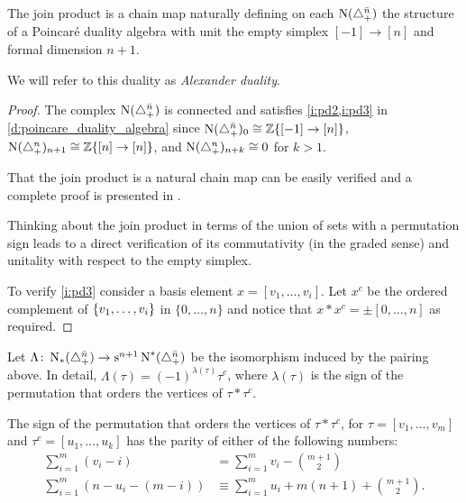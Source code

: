 \begin{theorem}
	The join product is a chain map naturally defining on each $\operatorname{N}(\triangle_{+}^{{\bar{n}}})$ the structure of a Poincar\'e duality algebra with unit the empty simplex $[-1] \to [n]$ and formal dimension $n+1$.
\end{theorem}
We will refer to this duality as \emph{Alexander duality}.

\begin{proof}
	The complex $\operatorname{N}(\triangle_{+}^{{\bar{n}}})$ is connected and satisfies \cref{i:pd2,i:pd3} in \cref{d:poincare_duality_algebra} since $\operatorname{N}(\triangle_{+}^{{\bar{n}}})_0 \cong \mathbb{Z}\{[-1] \to [n]\}$, $\operatorname{N}(\triangle_{+}^{n})_{n+1} \cong \mathbb{Z}\{[n] \to [n]\}$, and $\operatorname{N}(\triangle_{+}^{n})_{n+k} \cong 0$ for $k>1$.

	That the join product is a natural chain map can be easily verified and a complete proof is presented in \cite[p.19]{medina2020prop1}.

	Thinking about the join product in terms of the union of sets with a permutation sign leads to a direct verification of its commutativity (in the graded sense) and unitality with respect to the empty simplex.

	To verify \cref{i:pd3} consider a basis element $x = [v_1,\dots,v_i]$.
	Let $x^c$ be the ordered complement of $\{v_1,\dots,v_i\}$ in $\{0,\dots,n\}$ and notice that $x \ast x^c = \pm [0,\dots,n]$ as required.
\end{proof}
\begin{definition}
    Let $\Lambda\colon \operatorname{N}_*(\triangle_{+}^{\bar{n}})\to \operatorname{s}^{n+1}\operatorname{N}^*(\triangle_{+}^{\bar{n}})$ be the isomorphism induced by the pairing above. In detail, $\Lambda(\tau) = (-1)^{\lambda(\tau)}\tau^c$, where $\lambda(\tau)$ is the sign of the permutation that orders the vertices of $\tau*\tau^c$.
\end{definition}
\begin{remark}
    The sign of the permutation that orders the vertices of $\tau*\tau^c$, for $\tau = [v_1,\ldots,v_m]$ and $\tau^c  = [u_1,\ldots,u_k]$ has the parity of either of the following numbers: 
    \begin{align*}
        \sum_{i=1}^m (v_i-i) &= \sum_{i=1}^m v_i - \binom{m+1}{2} \\
        \sum_{i=1}^m (n-u_i-(m-i)) &\equiv \sum_{i=1}^m u_i +m(n+1)+\binom{m+1}{2}.
    \end{align*}
\end{remark}



